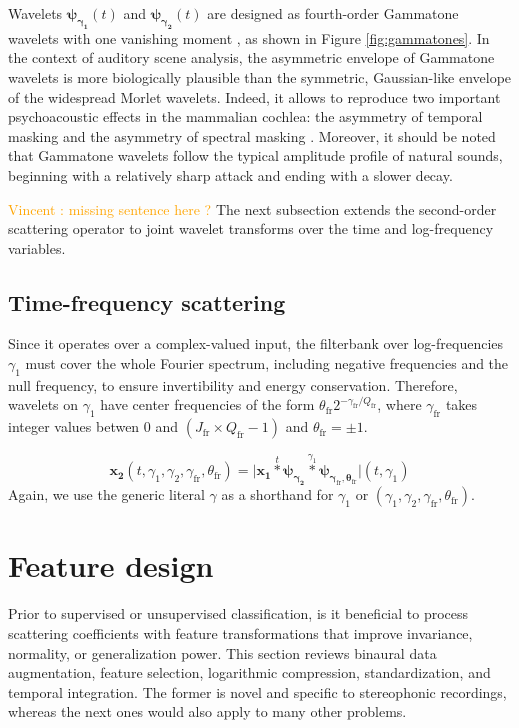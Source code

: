 \documentclass[journal]{IEEEtran}
\newcommand{\vl}[1]{\textcolor{orange}{Vincent : #1}}
\begin{document}
Wavelets
$\boldsymbol{\psi_{\gamma_1}}(t)$ and $\boldsymbol{\psi_{\gamma_2}}(t)$ are designed as fourth-order Gammatone
wavelets with one vanishing moment \cite{Venkitaraman2014}, as shown in Figure \ref{fig:gammatones}.
In the context of auditory scene analysis, the asymmetric envelope of Gammatone wavelets is more biologically plausible than the symmetric, Gaussian-like envelope of the widespread Morlet wavelets.
Indeed, it allows to reproduce two important psychoacoustic effects in the mammalian cochlea: the asymmetry of temporal masking and the asymmetry of spectral masking \cite{Fastl2007}.
Moreover, it should be noted that Gammatone wavelets follow the typical amplitude profile of natural sounds, beginning with a relatively sharp attack and ending with a slower decay.

\vl{missing sentence here ?}
The next subsection extends the second-order scattering operator to joint wavelet transforms over the time and log-frequency variables.

\subsection{Time-frequency scattering}

\cite{Anden2015}
Since it operates over a complex-valued input, the filterbank over log-frequencies $\gamma_1$ must cover the whole Fourier spectrum, including negative frequencies and the null frequency, to ensure invertibility and energy conservation.
Therefore, wavelets on $\gamma_1$ have center frequencies of the form
$\theta_{\mathrm{fr}}  2^{-\gamma_{\mathrm{fr}}/Q_{\mathrm{fr}}}$, where $\gamma_{\mathrm{fr}}$ takes integer values betwen $0$ and $(J_\mathrm{fr} \times Q_\mathrm{fr} - 1)$ and $\theta_{\mathrm{fr}} = \pm 1$.

\begin{equation}
\boldsymbol{x_2}(t,\gamma_1,\gamma_2,\gamma_{\mathrm{fr}},\theta_{\mathrm{fr}}) =
\vert \boldsymbol{x_1}
\overset{t}{\ast} \boldsymbol{\psi_{\gamma_2}}
\overset{\gamma_1}{\ast} \boldsymbol{\psi_{\gamma_{\mathrm{fr}}, \theta_{\mathrm{fr}}}}
\vert (t,\gamma_1)
\end{equation}
Again, we use the generic literal $\gamma$ as a shorthand for $\gamma_1$ or $(\gamma_1, \gamma_2, \gamma_{\mathrm{fr}}, \theta_{\mathrm{fr}})$.

\section{Feature design}
Prior to supervised or unsupervised classification, is it beneficial to process scattering coefficients with feature transformations that improve invariance, normality, or generalization power. 
This section reviews binaural data augmentation, feature selection, logarithmic compression, standardization, and temporal integration.
The former is novel and specific to stereophonic recordings, whereas the next ones would also apply to many other problems.
\end{document}
